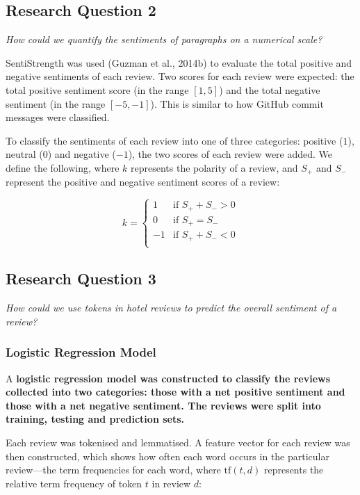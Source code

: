 \documentclass[12pt,bibliography=totocnumbered]{scrartcl}
\begin{document}
\subsection{Research Question 2}
\it{How could we quantify the sentiments of paragraphs on a numerical scale?}

SentiStrength was used (Guzman et al., 2014b) to evaluate the total positive %
and negative sentiments of each review. Two scores for each review were expected:
the total positive sentiment score (in the range $[1, 5]$) and the total negative
sentiment (in the range $[-5, -1]$). This is similar to how GitHub commit
messages were classified.

To classify the sentiments of each review into one of three categories:
positive ($1$), neutral ($0$) and negative ($-1$), the two scores of each review
were added. We define the following, where $k$ represents the polarity of a review,
and $S_+$ and $S_-$ represent the positive and negative sentiment scores of a review:

\begin{equation}
	k = \begin{cases}
		1  & \text{if } S_+ + S_- > 0 \\
		0  & \text{if } S_+ = S_-     \\
		-1 & \text{if } S_+ + S_- < 0 \\
	\end{cases}
	\label{eq:polarity}
\end{equation}

\subsection{Research Question 3}
\it{How could we use tokens in hotel reviews to predict the overall sentiment of a review?}

\subsubsection{Logistic Regression Model}
A \bf{logistic regression model} was constructed to classify the reviews collected into
two categories: those with a net positive sentiment and those with a net negative sentiment.
The reviews were split into training, testing and prediction sets.

Each review was tokenised and lemmatised. A feature vector for each review was
then constructed, which shows how often each word occurs in the particular review---the
term frequencies for each word, where $\text{tf}(t,d)$ represents the relative term frequency of
token $t$ in review $d$:
\end{document}
